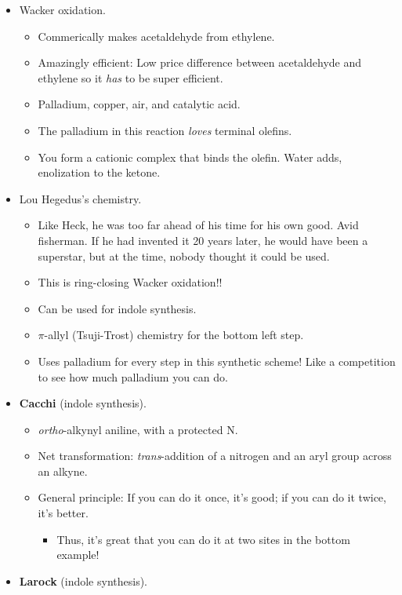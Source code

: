 \documentclass[../notes.tex]{subfiles}
\begin{document}
\begin{itemize}
    \item Wacker oxidation.
    \begin{itemize}
        \item Commerically makes acetaldehyde from ethylene.
        \item Amazingly efficient: Low price difference between acetaldehyde and ethylene so it \emph{has} to be super efficient.
        \item Palladium, copper, air, and catalytic acid.
        \item The palladium in this reaction \emph{loves} terminal olefins.
        \item You form a cationic  complex that binds the olefin. Water adds, enolization to the ketone.
    \end{itemize}
    \item Lou Hegedus's chemistry.
    \begin{itemize}
        \item Like Heck, he was too far ahead of his time for his own good. Avid fisherman. If he had invented it 20 years later, he would have been a superstar, but at the time, nobody thought it could be used.
        \item This is ring-closing Wacker oxidation!!
        \item Can be used for indole synthesis.
        \item $\pi$-allyl (Tsuji-Trost) chemistry for the bottom left step.
        \item Uses palladium for every step in this synthetic scheme! Like a competition to see how much palladium you can do.
    \end{itemize}
    \item \textbf{Cacchi} (indole synthesis).
    \begin{itemize}
        \item \emph{ortho}-alkynyl aniline, with a protected N.
        \item Net transformation: \emph{trans}-addition of a nitrogen and an aryl group across an alkyne.
        \item General principle: If you can do it once, it's good; if you can do it twice, it's better.
        \begin{itemize}
            \item Thus, it's great that you can do it at two sites in the bottom example!
        \end{itemize}
    \end{itemize}
    \item \textbf{Larock} (indole synthesis).

\end{itemize}
\end{document}
